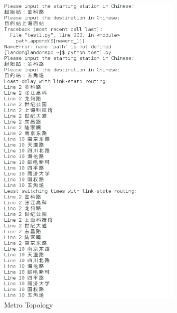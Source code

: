 \documentclass[12pt]{article}
\begin{document}
\begin{figure}[H]
	\begin{center}
		\includegraphics[width=0.8\textwidth]{figures/1}
	\end{center}
	\caption{Metro Topology}
	\label{1}
\end{figure}
\end{document}
